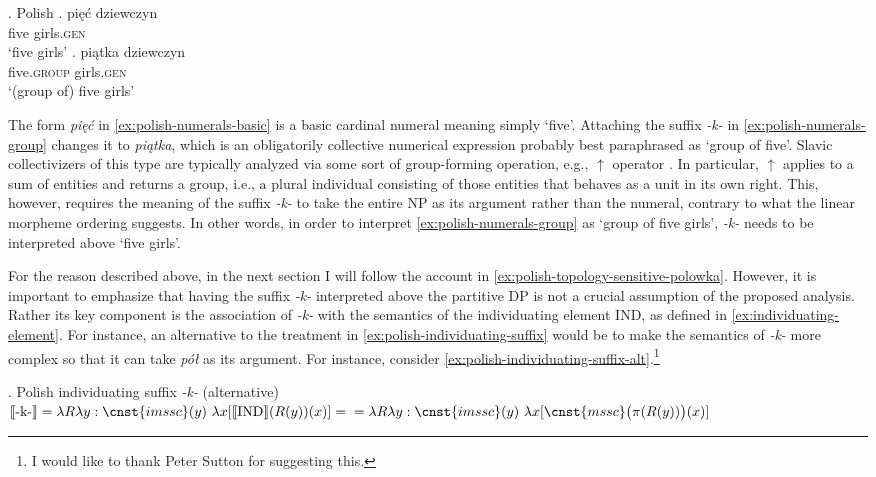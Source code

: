 	\ex. Polish\label{ex:polish-numerals}
	\ag. pięć dziewczyn\\
	five girls\textsc{.gen}\\
	`five girls'\label{ex:polish-numerals-basic}
	\bg. piątka dziewczyn\\
	five\textsc{.group} girls\textsc{.gen}\\
	`(group of) five girls'\label{ex:polish-numerals-group}
	
	The form \textit{pięć} in \ref{ex:polish-numerals-basic} is a basic cardinal numeral meaning simply `five'. Attaching the suffix \textit{-k-} in \ref{ex:polish-numerals-group} changes it to \textit{piątka}, which is an obligatorily collective numerical expression probably best paraphrased as `group of five'. Slavic collectivizers of this type are typically analyzed via some sort of group-forming operation, e.g.,  $\uparrow$ operator \citep[see, e.g.][]{docekal2012atoms,docekal2013numerals,wagiel2015sums}. In particular, $\uparrow$ applies to a sum of entities and returns a group, i.e., a plural individual consisting of those entities that behaves as a unit in its own right. This, however, requires the meaning of the suffix \textit{-k-} to take the entire NP as its argument rather than the numeral, contrary to what the linear morpheme ordering suggests. In other words, in order to interpret \ref{ex:polish-numerals-group} as `group of five girls', \textit{-k-} needs to be interpreted above `five girls'.

	For the reason described above, in the next section I will follow the account in \ref{ex:polish-topology-sensitive-polowka}. However, it is important to emphasize that having the suffix \textit{-k-} interpreted above the partitive DP is not a crucial assumption of the proposed analysis. Rather its key component is the association of \textit{-k-} with the semantics of the individuating element IND, as defined in \ref{ex:individuating-element}. For instance, an alternative to the treatment in \ref{ex:polish-individuating-suffix} would be to make the semantics of \textit{-k-} more complex so that it can take \textit{pół} as its argument. For instance, consider \ref{ex:polish-individuating-suffix-alt}.\footnote{I would like to thank Peter Sutton for suggesting this.}
	
	\ex. Polish individuating suffix \textit{-k-} (alternative)\\
	$\llbracket \text{-k-}\rrbracket = \lambda R \lambda y : \cnst{imssc}(y)\ \lambda x[\llbracket \text{IND}\rrbracket(R(y))(x)] = \\ = \lambda R \lambda y : \cnst{imssc}(y)\ \lambda x[\cnst{mssc}\big(\pi(R(y))\big)(x)]$\label{ex:polish-individuating-suffix-alt}
	
